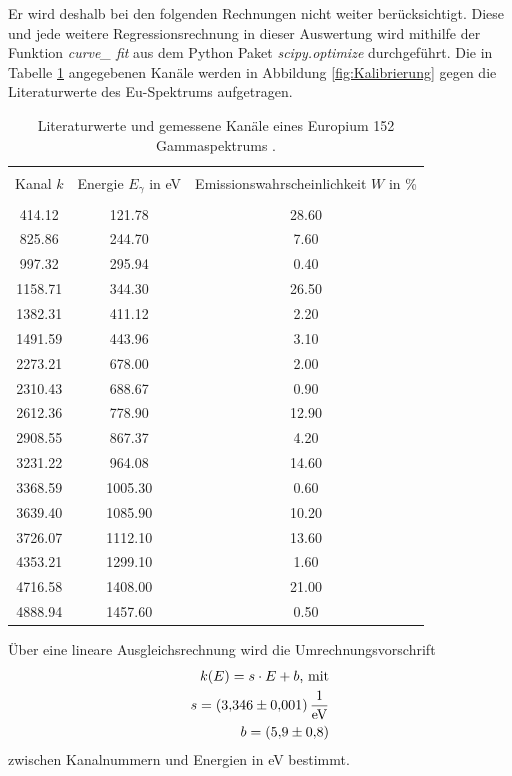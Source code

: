 Er wird deshalb bei den folgenden Rechnungen nicht weiter berücksichtigt.
Diese und jede weitere Regressionsrechnung in dieser Auswertung wird mithilfe der Funktion \textit{curve\_ fit} aus dem Python Paket \textit{scipy.optimize} durchgeführt.
Die in Tabelle \ref{tab:atab1} angegebenen Kanäle werden in Abbildung \ref{fig:Kalibrierung} gegen die Literaturwerte des Eu-Spektrums aufgetragen. 
\begin{table}
\centering
\caption{Literaturwerte und gemessene Kanäle eines Europium 152 Gammaspektrums \cite{sample}.}
\begin{tabular}{c c c}
\hline \\
Kanal $k$ &Energie $E_\gamma$ in eV & Emissionswahrscheinlichkeit $W$ in \% \\
\hline \\
414.12 & 121.78 & 28.60 \\ 825.86 & 244.70 & 7.60 \\ 997.32 & 295.94 & 0.40 \\ 1158.71 & 344.30 & 26.50 \\ 1382.31 & 411.12 & 2.20 \\ 1491.59 & 443.96 & 3.10 \\ 2273.21 & 678.00 & 2.00 \\ 2310.43 & 688.67 & 0.90 \\ 2612.36 & 778.90 & 12.90 \\ 2908.55 & 867.37 & 4.20 \\ 3231.22 & 964.08 & 14.60 \\ 3368.59 & 1005.30 & 0.60 \\ 3639.40 & 1085.90 & 10.20 \\ 3726.07 & 1112.10 & 13.60 \\ 4353.21 & 1299.10 & 1.60 \\ 4716.58 & 1408.00 & 21.00 \\ 4888.94 & 1457.60 & 0.50 \\ 
\hline
\end{tabular}
\label{tab:atab1}
\end{table}
Über eine lineare Ausgleichsrechnung wird die Umrechnungsvorschrift
\begin{align*}
k(E) = s \cdot E + b \text{, mit}\\
  s = \SI{3.346+-0.001}{\per\electronvolt}\\
  b = \SI{ 5.9+-0.8}{}
\end{align*}
zwischen Kanalnummern und Energien in eV bestimmt.
